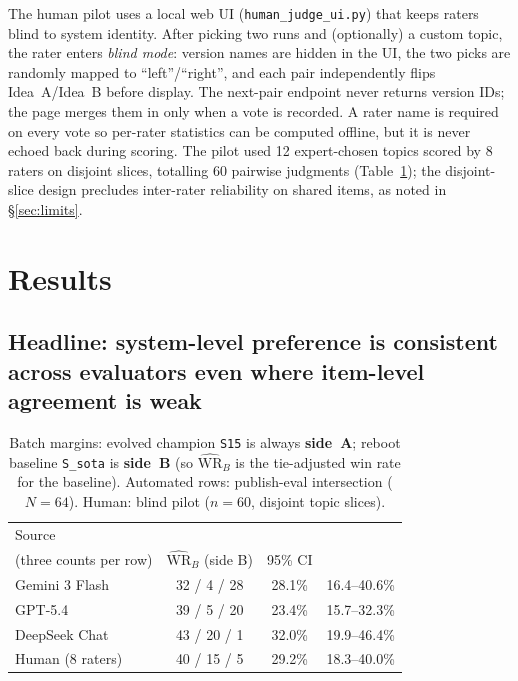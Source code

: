 \documentclass{article}
\begin{document}
The human pilot uses a local web UI (\texttt{human\_judge\_ui.py}) that keeps raters blind to system identity. After picking two runs and (optionally) a custom topic, the rater enters \emph{blind mode}: version names are hidden in the UI, the two picks are randomly mapped to ``left''/``right'', and each pair independently flips Idea~A/Idea~B before display. The next-pair endpoint never returns version IDs; the page merges them in only when a vote is recorded. A rater name is required on every vote so per-rater statistics can be computed offline, but it is never echoed back during scoring. The pilot used 12 expert-chosen topics scored by 8 raters on disjoint slices, totalling 60 pairwise judgments (Table~\ref{tab:margins}); the disjoint-slice design precludes inter-rater reliability on shared items, as noted in \S\ref{sec:limits}.

\FloatBarrier

\section{Results}

\subsection{Headline: system-level preference is consistent across evaluators even where item-level agreement is weak}
\label{sec:headline}

\begin{table}[t]
  \centering
  \scriptsize
  \setlength{\tabcolsep}{2pt}
  \begin{tabular}{@{}lccc@{}}
    \toprule
    Source & \shortstack[l]{\texttt{S15} (A) / \texttt{S\_sota} (B) / tie\\(three counts per row)} & $\widehat{\mathrm{WR}}_B$ (side B) & 95\% CI \\
    \midrule
    Gemini 3 Flash & 32 / 4 / 28 & 28.1\% & 16.4--40.6\% \\
    GPT-5.4        & 39 / 5 / 20 & 23.4\% & 15.7--32.3\% \\
    DeepSeek Chat  & 43 / 20 / 1 & 32.0\% & 19.9--46.4\% \\
    Human (8 raters) & 40 / 15 / 5 & 29.2\% & 18.3--40.0\% \\
    \bottomrule
  \end{tabular}
  \caption{Batch margins: evolved champion \texttt{S15} is always \textbf{side~A}; reboot baseline \texttt{S\_sota} is \textbf{side~B} (so $\widehat{\mathrm{WR}}_B$ is the tie-adjusted win rate for the baseline). Automated rows: publish-eval intersection ($N{=}64$). Human: blind pilot ($n{=}60$, disjoint topic slices).}
  \label{tab:margins}
\end{table}
\end{document}
